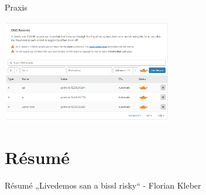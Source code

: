 \documentclass[10pt, unknownkeysallowed]{beamer}
\begin{document}
\begin{frame}{Praxis}
\begin{minipage}{\textwidth}
    \vspace*{10px}
    \hfill\includegraphics[height=170px]{demo2.png}\hfill
    \vspace*{10px}
\end{minipage}
\end{frame}

\section{Ré­su­mé}
\begin{frame}{Ré­su­mé}
	„Livedemos san a bissl risky“ - Florian Kleber
\end{frame}


\appendix
%
%  
%  
%
\end{document}

